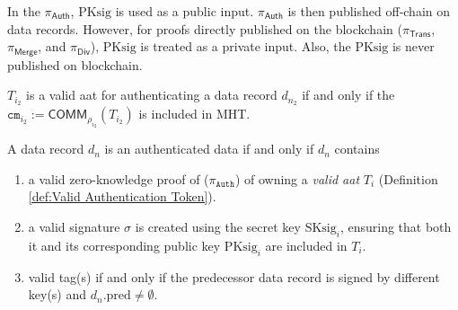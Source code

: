 

\begin{remark} 
In the $\pi_\textsf{Auth}$, $\text{PKsig}$ is used as a public input. $\pi_\textsf{Auth}$ is then published off-chain on data records. However, for proofs directly published on the blockchain ($\pi_\textsf{Trans}$, $\pi_\textsf{Merge}$, and $\pi_\textsf{Div}$), $\text{PKsig}$ is treated as a private input. Also, the $\text{PKsig}$ is never published on blockchain. 
\end{remark}


\begin{definition}
	\label{def:Valid Authentication Token}
	$T_{i_2}$ is a valid \gls{aat} for authenticating a data record $d_{n_2}$ if and only if
	the $\texttt{cm}_{i_2} := \mathsf{COMM}_{\rho_{i_2}}(T_{i_2})$ is included in \textsf{MHT}.
\end{definition}


\begin{definition}
	\label{def:Authenticated Data}
	A data record $d_{n}$ is an authenticated data if and only if $d_{n}$ contains
	\begin{enumerate}
		\item  a valid zero-knowledge proof of ($\pi_\texttt{Auth}$) of owning a \textit{valid \gls{aat}} $T_{i}$ (Definition \ref{def:Valid Authentication Token}).
		\item a valid signature $\sigma$ is created using the secret key $\text{SKsig}_{i}$, ensuring that both it and its corresponding public key $\text{PKsig}_{i}$ are included in $T_{i}$.
		\item valid tag(s) if and only if the predecessor data record is signed by different key(s) and $d_{n}.\text{pred} \neq \emptyset$.
	\end{enumerate}
\end{definition}

